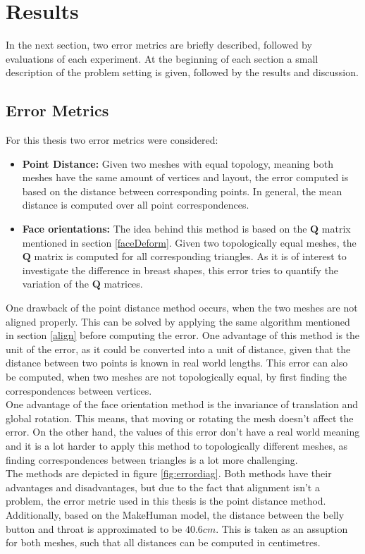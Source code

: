 \chapter{Results}
In the next section, two error metrics are briefly described, followed by evaluations of each experiment. At the beginning of each section a small description of the problem setting is given, followed by the results and discussion.

\section{Error Metrics}
\label{Emetrics}
For this thesis two error metrics were considered:
\begin{itemize}
  \item \textbf{Point Distance:} Given two meshes with equal topology, meaning both meshes have the same amount of vertices and layout, the error computed is based on the distance between corresponding points. In general, the mean distance is computed over all point correspondences.
  \item \textbf{Face orientations:} The idea behind this method is based on the $\mathbf{Q}$ matrix mentioned in section \ref{faceDeform}. Given two topologically equal meshes, the $\mathbf{Q}$ matrix is computed for all corresponding triangles. As it is of interest to investigate the difference in breast shapes, this error tries to quantify the variation of the $\mathbf{Q}$ matrices.
\end{itemize}

One drawback of the point distance method occurs, when the two meshes are not aligned properly. This can be solved by applying the same algorithm mentioned in section \ref{align} before computing the error. One advantage of this method is the unit of the error, as it could be converted into a unit of distance, given that the distance between two points is known in real world lengths. This error can also be computed, when two meshes are not topologically equal, by first finding the correspondences between vertices.\\
One advantage of the face orientation method is the invariance of translation and global rotation. This means, that moving or rotating the mesh doesn't affect the error. On the other hand, the values of this error don't have a real world meaning and it is a lot harder to apply this method to topologically different meshes, as finding correspondences between triangles is a lot more challenging.\\
The methods are depicted in figure \ref{fig:errordiag}. Both methods have their advantages and disadvantages, but due to the fact that alignment isn't a problem, the error metric used in this thesis is the point distance method. Additionally, based on the MakeHuman model, the distance between the belly button and throat is approximated to be $40.6cm$. This is taken as an assuption for both meshes, such that all distances can be computed in centimetres.

